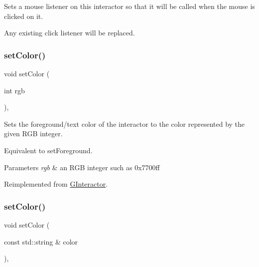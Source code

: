 Sets a mouse listener on this interactor so that it will be called when the mouse is clicked on it. 

Any existing click listener will be replaced. \mbox{\label{classsgl_1_1GLabel_a165735fb49fa7db12602d32557cbfe0d}} 
\subsubsection{\texorpdfstring{set\+Color()}{setColor()}\hspace{0.1cm}{\footnotesize\ttfamily [1/2]}}
{\footnotesize\ttfamily void set\+Color (\begin{DoxyParamCaption}\item[{int}]{rgb }\end{DoxyParamCaption})\hspace{0.3cm}{\ttfamily [override]}, {\ttfamily [virtual]}}



Sets the foreground/text color of the interactor to the color represented by the given R\+GB integer. 

Equivalent to set\+Foreground. 
\begin{DoxyParams}{Parameters}
{\em rgb} & an R\+GB integer such as 0x7700ff \\
\hline
\end{DoxyParams}


Reimplemented from \mbox{\hyperlink{classsgl_1_1GInteractor_ab1f5cc0f5cc6bbbd716a526c61f1081d}{G\+Interactor}}.

\mbox{\label{classsgl_1_1GLabel_a56845b1accc47aa881d05939eef6996c}} 
\subsubsection{\texorpdfstring{set\+Color()}{setColor()}\hspace{0.1cm}{\footnotesize\ttfamily [2/2]}}
{\footnotesize\ttfamily void set\+Color (\begin{DoxyParamCaption}\item[{const std\+::string \&}]{color }\end{DoxyParamCaption})\hspace{0.3cm}{\ttfamily [override]}, {\ttfamily [virtual]}}



